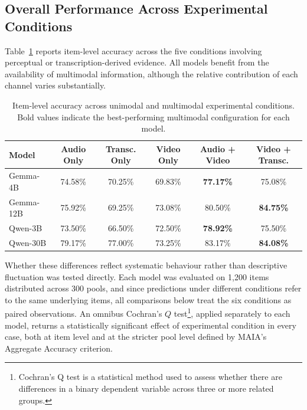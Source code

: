 \subsection*{Overall Performance Across Experimental Conditions}
\label{subsec:overall_performance}
Table~\ref{tab:overall_condition_performance} reports item-level accuracy across the five conditions involving perceptual or transcription-derived evidence. All models benefit from the availability of multimodal information, although the relative contribution of each channel varies substantially.
\begin{table}[h]
    \centering
    \small
    \begin{tabular}{lccccc}
        \hline
        \textbf{Model} &
        \textbf{Audio Only} &
        \textbf{Transc. Only} &
        \textbf{Video Only} &
        \textbf{Audio + Video} &
        \textbf{Video + Transc.} \\
        \hline
        Gemma-4B    &
        74.58\% &
        70.25\% &
        69.83\% &
        \textbf{77.17\%} &
        75.08\% \\
        
        Gemma-12B &
        75.92\% &
        69.25\% &
        73.08\% &
        80.50\% &
        \textbf{84.75\%} \\
        
        Qwen-3B &
        73.50\% &
        66.50\% &
        72.50\% &
        \textbf{78.92\%} &
        75.50\% \\
        
        Qwen-30B &
        79.17\% &
        77.00\% &
        73.25\% &
        83.17\% &
        \textbf{84.08\%} \\
        \hline
    \end{tabular}
    \caption{Item-level accuracy across unimodal and multimodal experimental conditions. Bold values indicate the best-performing multimodal configuration for each model.}
    \label{tab:overall_condition_performance}
\end{table}
Whether these differences reflect systematic behaviour rather than descriptive fluctuation was tested directly. Each model was evaluated on 1,200 items distributed across 300 pools, and since predictions under different conditions refer to the same underlying items, all comparisons below treat the six conditions as paired observations. An omnibus Cochran's $Q$ test\footnote{Cochran's Q test is a statistical method used to assess whether there are differences in a binary dependent variable across three or more related groups.}, applied separately to each model, returns a statistically significant effect of experimental condition in every case, both at item level and at the stricter pool level defined by MAIA's Aggregate Accuracy criterion.
